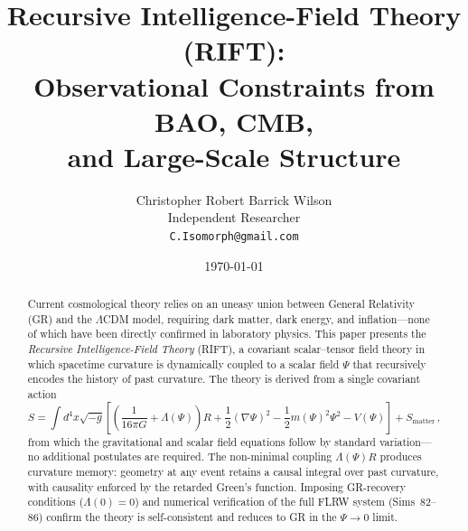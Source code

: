 \documentclass[12pt,a4paper]{article}
\begin{document}
\title{Recursive Intelligence-Field Theory (RIFT):\\
Observational Constraints from BAO, CMB,\\
and Large-Scale Structure}

\author{Christopher Robert Barrick Wilson\\
\small Independent Researcher\\
\small \texttt{C.Isomorph@gmail.com}}

\date{\today}

\maketitle

\begin{abstract}
Current cosmological theory relies on an uneasy union between General
Relativity (GR) and the $\Lambda$CDM model, requiring dark matter, dark
energy, and inflation---none of which have been directly confirmed in
laboratory physics. This paper presents the \emph{Recursive
Intelligence-Field Theory} (RIFT), a covariant scalar--tensor field
theory in which spacetime curvature is dynamically coupled to a scalar
field $\Psi$ that recursively encodes the history of past curvature.
The theory is derived from a single covariant action
\begin{equation*}
S = \int d^4x\sqrt{-g}
\left[\left(\frac{1}{16\pi G}+\Lambda(\Psi)\right)R
+ \frac{1}{2}(\nabla\Psi)^2
- \frac{1}{2}m(\Psi)^2\Psi^2 - V(\Psi)\right] + S_{\mathrm{matter}}\,,
\end{equation*}
from which the gravitational and scalar field equations follow by
standard variation---no additional postulates are required. The
non-minimal coupling $\Lambda(\Psi)R$ produces curvature memory: geometry
at any event retains a causal integral over past curvature, with
causality enforced by the retarded Green's function. Imposing GR-recovery
conditions ($\Lambda(0)=0$) and numerical verification of the full FLRW
system (Sims~82--86) confirm the theory is self-consistent and reduces to
GR in the $\Psi\to 0$ limit.


\end{abstract}
\end{document}
